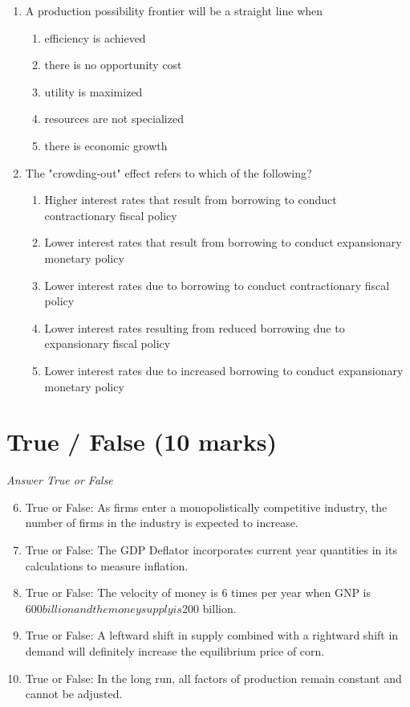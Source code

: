 \documentclass[12pt]{article}
\begin{document}
\begin{enumerate}[label=\arabic*.]
\begin{enumerate}[label=(\alph*)]
\end{enumerate}
\item A production possibility frontier will be a straight line when
\begin{enumerate}[label=(\alph*)]
    \item efficiency is achieved
    \item there is no opportunity cost
    \item utility is maximized
    \item resources are not specialized
    \item there is economic growth
\end{enumerate}
\item The "crowding-out" effect refers to which of the following?
\begin{enumerate}[label=(\alph*)]
    \item Higher interest rates that result from borrowing to conduct contractionary fiscal policy
    \item Lower interest rates that result from borrowing to conduct expansionary monetary policy
    \item Lower interest rates due to borrowing to conduct contractionary fiscal policy
    \item Lower interest rates resulting from reduced borrowing due to expansionary fiscal policy
    \item Lower interest rates due to increased borrowing to conduct expansionary monetary policy
\end{enumerate}
\end{enumerate}

\section*{True / False (10 marks)}
\textit{Answer True or False}
\begin{enumerate}[label=\arabic*.]
\setcounter{enumi}{5}
\item True or False: As firms enter a monopolistically competitive industry, the number of firms in the industry is expected to increase.
\item True or False: The GDP Deflator incorporates current year quantities in its calculations to measure inflation.
\item True or False: The velocity of money is 6 times per year when GNP is $600 billion and the money supply is $200 billion.
\item True or False: A leftward shift in supply combined with a rightward shift in demand will definitely increase the equilibrium price of corn.
\item True or False: In the long run, all factors of production remain constant and cannot be adjusted.
\end{enumerate}
\end{document}
